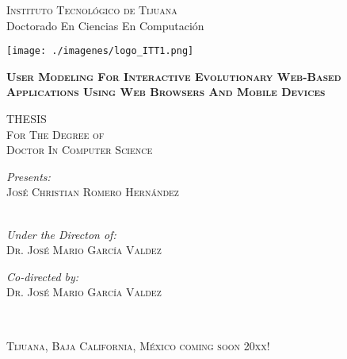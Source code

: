 \begin{titlepage}
\setlength{\parindent}{0pt} \setlength{\parskip}{0pt}

\begin{center}

\textsc{\Large Instituto Tecnol\'ogico de Tijuana}\\

{\large Doctorado En Ciencias En Computaci\'on}\\[1cm]
\end{center}

\begin{center}
	\texttt{[image: ./imagenes/logo\_ITT1.png]}
\end{center}

\begin{center}
	\vfill	
	\textsc{\Large \bfseries User Modeling For Interactive Evolutionary Web-Based Applications Using Web Browsers And Mobile Devices}\\[0.3cm]		
\end{center}


\begin{center}
	\textsc{THESIS}\\%
	\textsc{For The Degree of}	\\%
	\textsc{Doctor In Computer Science}	\\%
\end{center}

\begin{center}
	\emph{Presents:}\\
	\textsc{\Large Jos\'e Christian Romero Hern\'andez}\\
	\textsc{}\\
\end{center}

\begin{minipage}{0.5\textwidth}
	\begin{center}
 		\emph{Under the Directon of:}\\
 		\textsc{Dr. Jos\'e Mario Garc\'ia Valdez}
	\end{center}
\end{minipage}
\begin{minipage}{0.5\textwidth}
	\begin{center}
		\emph{Co-directed by:} \\
		\textsc{Dr. Jos\'e Mario Garc\'ia Valdez}
		\textsc{}
	\end{center}
\end{minipage}
\\[0.4cm]


\begin{center}
	\small \textsc{Tijuana, Baja California, M\'exico \hspace{5cm} coming soon 20xx!}
\end{center}

\end{titlepage}

